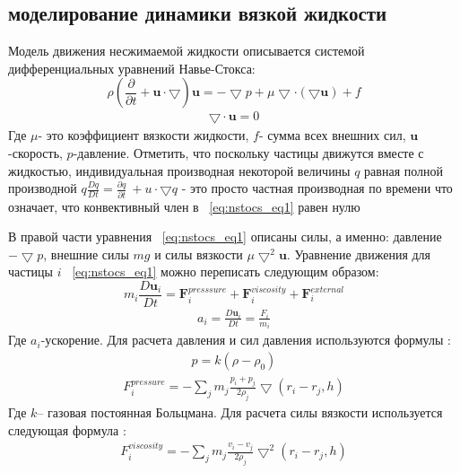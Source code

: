 \subsection{моделирование динамики вязкой жидкости}\label{subsec:ch1/sec4/sub1}

Модель движения несжимаемой жидкости описывается системой дифференциальных уравнений Навье-Стокса:
\begin{equation}
    \label{eq:nstocs_eq1}
    \rho \left ( \frac{\partial }{\partial t} + \mathbf{u} \cdot \bigtriangledown \right )\mathbf{u}=-\bigtriangledown p + \mu \bigtriangledown \cdot (\bigtriangledown \mathbf{u})+f
\end{equation}
\begin{align}
    \bigtriangledown \cdot \mathbf{u} = 0 \nonumber
\end{align}
Где \(\mu\)- это коэффициент вязкости жидкости, \(f\)- сумма всех внешних сил, \(\mathbf{u}\)-скорость, \(p\)-давление. Отметить, что поскольку частицы движутся вместе с жидкостью, индивидуальная производная некоторой величины \(q\) равная полной производной \(q\frac{Dq}{Dt}=\frac{\partial q}{\partial t}\ + u \cdot \bigtriangledown q\) - это просто частная производная по времени что означает, что конвективный член в ~\ref{eq:nstocs_eq1} равен нулю \cite {Müller2003, Sedov1970}

В правой части уравнения ~\ref{eq:nstocs_eq1} описаны силы, а именно: давление \(-\bigtriangledown p\), внешние силы \(mg\) и силы вязкости \( \mu \bigtriangledown^{2}\mathbf{u} \). Уравнение движения для частицы \(i\) ~\ref{eq:nstocs_eq1} можно переписать следующим образом:
\begin{equation}
    \label{eq:common_disk}
    m_i\frac{D\mathbf{u}_i}{Dt}=\mathbf{F}_i^{presssure} + \mathbf{F}_i^{viscosity} + \mathbf{F}_i^{external}
\end{equation}
\begin{align}
    a_i=\frac{D\mathbf{u}_i}{Dt}=\frac{F_i}{m_i} \nonumber
\end{align}
Где \(a_i\)-ускорение. Для расчета давления и сил давления используются формулы \cite {Müller2003}:
\begin{align}
    p=k(\rho - \rho_0) \nonumber
\end{align}
\begin{align}
    F_{i}^{pressure}=-\sum_{j}m_j\frac{p_i+p_j}{2 \rho_j}\bigtriangledown(r_i-r_j, h) \nonumber
\end{align}
Где \(k\)– газовая постоянная Больцмана. Для расчета силы вязкости используется следующая формула \cite {Müller2003}:
\begin{align}
    F_{i}^{viscosity}=-\sum_{j}m_j\frac{v_i-v_j}{2 \rho_j}\bigtriangledown^{2}(r_i-r_j, h) \nonumber
\end{align}

